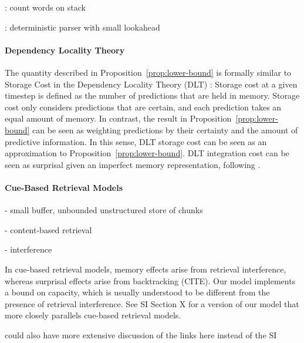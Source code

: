 \cite{gerth2009unifying}


\cite{wanner1978atn}
\cite{frazier1978sausage}

\cite{rambow201512}: count words on stack

\cite{boston2012computational}

\cite{just1992capacity}

\cite{marcus1978theory}: deterministic parser with small lookahead

\paragraph{Dependency Locality Theory}
The quantity described in Proposition~\ref{prop:lower-bound} is formally similar to Storage Cost in the Dependency Locality Theory (DLT) \citep{gibson-linguistic-1998}: Storage cost at a given timestep is defined as the number of predictions that are held in memory.
Storage cost only considers predictions that are certain, and each prediction takes an equal amount of memory.
In contrast, the result in Proposition~\ref{prop:lower-bound} can be seen as weighting predictions by their certainty and the amount of predictive information.
In this sense, DLT storage cost can be seen as an approximation to Proposition~\ref{prop:lower-bound}.
DLT integration cost can be seen as surprisal given an imperfect memory representation, following \cite{futrell-noisy-context-2017}.

\paragraph{Cue-Based Retrieval Models}
- small buffer, unbounded unstructured store of chunks

- content-based retrieval

- interference


In cue-based retrieval models, memory effects arise from retrieval interference, whereas surprisal effects arise from backtracking (CITE).
Our model implements a bound on capacity, which is usually understood to be different from the presence of retrieval interference.
See SI Section X for a version of our model that more closely parallels cue-based retrieval models.

could also have more extensive discussion of the links here instead of the SI


